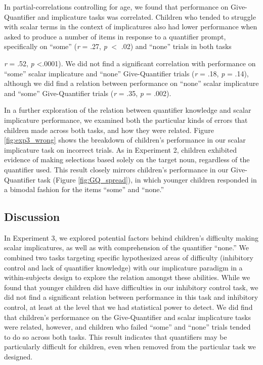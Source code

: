 \documentclass[man]{apa2}
\begin{document}
In partial-correlations controlling for age, we found that performance on Give-Quantifier and implicature tasks was correlated. Children who tended to struggle with scalar terms in the context of implicatures also had lower performance when asked to produce a number of items in response to a quantifier prompt, specifically on ``some''  (\textit{r} = .27, \textit{p} $<$ .02) and ``none'' trials in both tasks {\textit{r} = .52, \textit{p} \textless .0001). We did not find a significant correlation with performance on ``some'' scalar implicature and ``none'' Give-Quantifier trials (\textit{r} = .18, \textit{p} = .14), although we did find a relation between performance on ``none'' scalar implicature and ``some'' Give-Quantifier trials (\textit{r} = .35, \textit{p} = .002).

In a further exploration of the relation between quantifier knowledge and scalar implicature performance, we examined both the particular kinds of errors that children made across both tasks, and how they were related. Figure \ref{fig:exp3_wrong} shows the breakdown of children's performance in our scalar implicature task on incorrect trials. As in Experiment 2, children exhibited evidence of making selections based solely on the target noun, regardless of the quantifier used. This result closely mirrors children's performance in our Give-Quantifier task (Figure \ref{fig:GQ_spread}), in which younger children responded in a bimodal fashion for the items ``some'' and ``none.''


\subsection{Discussion}

In Experiment 3, we explored potential factors behind children's difficulty making scalar implicatures, as well as with comprehension of the quantifier ``none.'' We combined two tasks targeting specific hypothesized areas of difficulty (inhibitory control and lack of quantifier knowledge) with our implicature paradigm in a within-subjects design to explore the relation amongst these abilities. While we found that younger children did have difficulties in our inhibitory control task, we did not find a significant relation between performance in this task and inhibitory control, at least at the level that we had statistical power to detect. We did find that children's performance on the Give-Quantifier and scalar implicature tasks were related, however, and children who failed ``some'' and ``none'' trials tended to do so across both tasks. This result indicates that quantifiers may be particularly difficult for children, even when removed from the particular task we designed.

}
\end{document}
